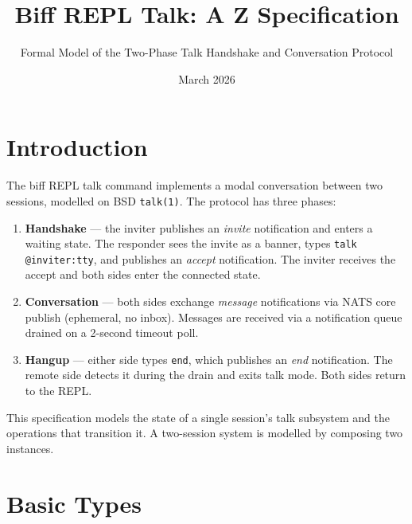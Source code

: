 \documentclass[a4paper,10pt,fleqn]{article}
\begin{document}
\title{Biff REPL Talk: A Z Specification}
\author{Formal Model of the Two-Phase Talk Handshake and Conversation Protocol}
\date{March 2026}
\maketitle

\tableofcontents
\newpage

\section{Introduction}
\label{sec:introduction}

The biff REPL talk command implements a modal conversation between two
sessions, modelled on BSD \texttt{talk(1)}.  The protocol has three
phases:

\begin{enumerate}
\item \textbf{Handshake} --- the inviter publishes an \textit{invite}
  notification and enters a waiting state.  The responder sees the
  invite as a banner, types \texttt{talk @inviter:tty}, and publishes
  an \textit{accept} notification.  The inviter receives the accept
  and both sides enter the connected state.

\item \textbf{Conversation} --- both sides exchange \textit{message}
  notifications via NATS core publish (ephemeral, no inbox).  Messages
  are received via a notification queue drained on a 2-second timeout
  poll.

\item \textbf{Hangup} --- either side types \texttt{end}, which
  publishes an \textit{end} notification.  The remote side detects it
  during the drain and exits talk mode.  Both sides return to the REPL.
\end{enumerate}

This specification models the state of a single session's talk
subsystem and the operations that transition it.  A two-session
system is modelled by composing two instances.

\section{Basic Types}
\end{document}
